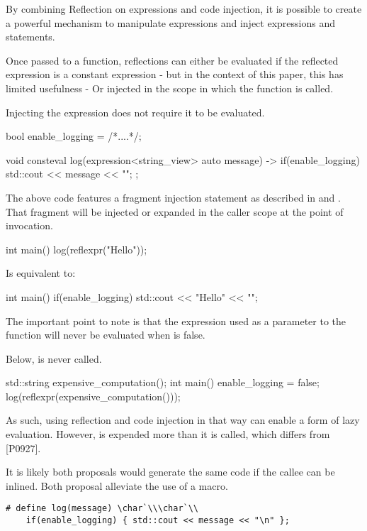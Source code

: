 \documentclass{wg21}
\begin{document}
By combining Reflection on expressions and code injection, it is possible to create a powerful
mechanism to manipulate expressions and inject expressions and statements.
 
Once passed to a  function, reflections can either be evaluated if the reflected expression is a constant expression
- but in the context of this paper, this has limited usefulness - Or injected in the scope in which the function is called.

Injecting the expression does not require it to be evaluated.

\begin{codeblock}
bool enable_logging = /*....*/;

void consteval log(expression<string_view> auto message) {
  -> {
        if(enable_logging) {
            std::cout << message << "\n";
        }
    };
}
\end{codeblock}

The above code features a fragment injection statement as described in \cite{P0712R0} and \cite{P0633R0}.
That fragment will be injected or expanded in the caller scope at the point of invocation.

\begin{codeblock}
int main() {
    log(reflexpr("Hello"));
}
\end{codeblock}

Is equivalent to:

\begin{codeblock}
int main() {
   if(enable_logging) {
       std::cout << "Hello" << "\n";
   }
}
\end{codeblock}

The important point to note is that the expression used as a parameter to the  function will never be evaluated
when  is false.

Below,  is never called.

\begin{codeblock}
std::string expensive_computation();
int main() {
    enable_logging = false;
    log(reflexpr(expensive_computation()));
}
\end{codeblock}

As such, using reflection and code injection in that way can enable a form of lazy evaluation.
However,  is expended more than it is called, which differs from [P0927]\cite{P0927R2}.

It is likely both proposals would generate the same code if the callee can be inlined.
Both proposal alleviate the use of a macro.
\begin{lstlisting}
# define log(message) \char`\\\char`\\
    if(enable_logging) { std::cout << message << "\n" };
\end{lstlisting}
\end{document}
